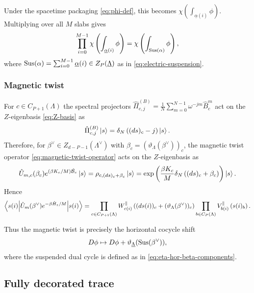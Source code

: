 Under the spacetime packaging \eqref{eq:phi-def}, this becomes $\chi\left(\int_{\underline\alpha(i)}\phi\right)$.
Multiplying over all \(M\) slabs gives
\begin{equation}
	\prod_{i=0}^{M-1}
	\chi\left(\int_{\underline\alpha(i)}\phi\right)
	=
	\chi\left(\int_{\operatorname{Sus}(\alpha)}\phi\right),
	\label{eq:Sus-alpha-factor}
\end{equation}
where $\operatorname{Sus}(\alpha)=\sum_{i=0}^{M-1}\underline\alpha(i)\in Z_P(\underline\Lambda)$ as in \eqref{eq:electric-suspension}.

\subsubsection{Magnetic twist}
\label{app:magnetic-twist}

For $c\in C_{P+1}(\Lambda)$ the spectral projectors $\hat\Pi_{c,j}^{(B)} = \frac{1}{N} \sum_{m=0}^{N-1} \omega^{-jm} \hat B_c^m$ act on the $Z$-eigenbasis \eqref{eq:Z-basis} as
\begin{equation}
	\hat\Pi_{c,j}^{(B)}\ket{s}
	=
	\delta_N\left((ds)_c-j\right)\ket{s}.
\end{equation}
Therefore, for $\beta^\vee\in Z_{d-P-1}(\Lambda^\vee)$ with $\beta_c = (\vartheta_\Lambda(\beta^\vee))_c$, the  magnetic twist operator \eqref{eq:magnetic-twist-operator} acts on the $Z$-eigenbasis as
\begin{equation}
	\hat U_{m,c}(\beta_c)e^{(\beta K_c/M)\hat{\mathcal B}_c}\ket{s}
	=
	\rho_{c,(ds)_c+\beta_c}\ket{s}
	=
	\exp\left(
	\frac{\beta K_c}{M}\delta_N\left((ds)_c+\beta_c\right)
	\right)\ket{s}.
	\label{eq:Um-shift}
\end{equation}
Hence
\begin{equation}
	\left\langle s(i) \middle| \hat U_m(\beta^\vee)e^{-\beta\hat H_z/M} \middle| s(i) \right\rangle
	=
	\prod_{c\in C_{P+1}(\Lambda)}
	W_{c(i)}^{\parallel}
	\left((ds(i))_c+(\vartheta_\Lambda(\beta^\vee))_c\right)
	\prod_{b\in C_P(\Lambda)}
	V_{b(i)}^{\parallel}\left(s(i)_b\right).
	\label{eq:magnetic-twist-zkernel}
\end{equation}

Thus the magnetic twist is precisely the horizontal cocycle shift
\begin{equation}
	D\phi
	\mapsto
	D\phi+\vartheta_{\underline\Lambda}(\operatorname{Sus}(\beta^\vee)),
\end{equation}
where the suspended dual cycle is defined as in \eqref{eq:eta-hor-beta-components}.

\subsection{Fully decorated trace}
\label{app:TrFull}

